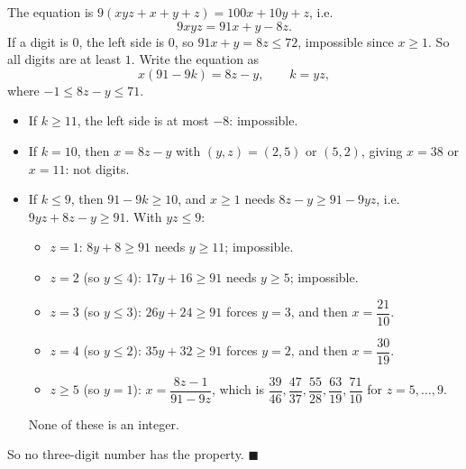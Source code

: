 The equation is $9(xyz+x+y+z)=100x+10y+z$, i.e.
\[9xyz=91x+y-8z.\]
If a digit is $0$, the left side is $0$, so $91x+y=8z\le72$, impossible since $x\ge1$. So all digits are at least $1$. Write the equation as
\[x\left(91-9k\right)=8z-y,\qquad k=yz,\]
where $-1\le8z-y\le71$.
\begin{itemize}
\item If $k\ge11$, the left side is at most $-8$: impossible.
\item If $k=10$, then $x=8z-y$ with $(y,z)=(2,5)$ or $(5,2)$, giving $x=38$ or $x=11$: not digits.
\item If $k\le9$, then $91-9k\ge10$, and $x\ge1$ needs $8z-y\ge91-9yz$, i.e. $9yz+8z-y\ge91$. With $yz\le9$:
\begin{itemize}
\item $z=1$: $8y+8\ge91$ needs $y\ge11$; impossible.
\item $z=2$ (so $y\le4$): $17y+16\ge91$ needs $y\ge5$; impossible.
\item $z=3$ (so $y\le3$): $26y+24\ge91$ forces $y=3$, and then $x=\dfrac{21}{10}$.
\item $z=4$ (so $y\le2$): $35y+32\ge91$ forces $y=2$, and then $x=\dfrac{30}{19}$.
\item $z\ge5$ (so $y=1$): $x=\dfrac{8z-1}{91-9z}$, which is $\dfrac{39}{46},\dfrac{47}{37},\dfrac{55}{28},\dfrac{63}{19},\dfrac{71}{10}$ for $z=5,\dots,9$.
\end{itemize}
None of these is an integer.
\end{itemize}
So no three-digit number has the property. $\blacksquare$
